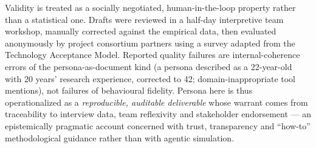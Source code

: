 Validity is treated as a socially negotiated, human-in-the-loop property rather than a statistical one. Drafts were reviewed in a half-day interpretive team workshop, manually corrected against the empirical data, then evaluated anonymously by project consortium partners using a survey adapted from the Technology Acceptance Model. Reported quality failures are internal-coherence errors of the persona-as-document kind (a persona described as a 22-year-old with 20 years' research experience, corrected to 42; domain-inappropriate tool mentions), not failures of behavioural fidelity. Persona here is thus operationalized as a \emph{reproducible, auditable deliverable} whose warrant comes from traceability to interview data, team reflexivity and stakeholder endorsement --- an epistemically pragmatic account concerned with trust, transparency and ``how-to'' methodological guidance rather than with agentic simulation.

